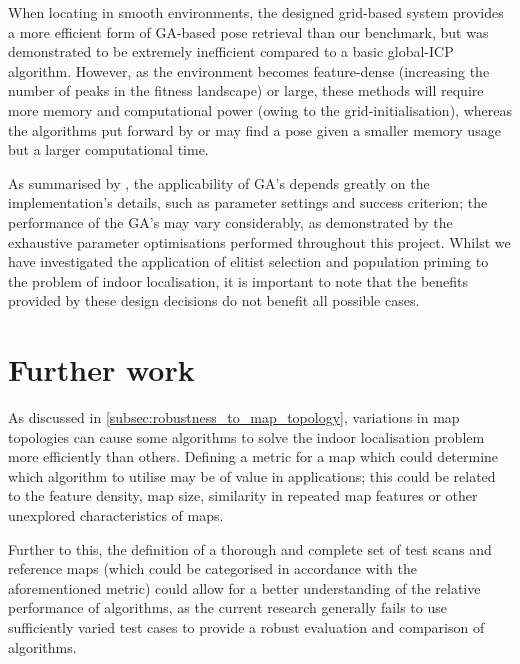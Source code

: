 \documentclass[authoryearcitations]{UoYCSproject}
\begin{document}
When locating in smooth environments, the designed grid-based system provides a more efficient form of GA-based pose retrieval than our benchmark, but was demonstrated to be extremely inefficient compared to a basic global-ICP algorithm. However, as the environment becomes feature-dense (increasing the number of peaks in the fitness landscape) or large, these methods will require more memory and computational power (owing to the grid-initialisation), whereas the algorithms put forward by \citet{Robertson2002-ou} or \citet{Lenac2007-xm} may find a pose given a smaller memory usage but a larger computational time. 

As summarised by \citet{Mitchell1998-td}, the applicability of GA's depends greatly on the implementation's details, such as parameter settings and success criterion; the performance of the GA's may vary considerably, as demonstrated by the exhaustive parameter optimisations performed throughout this project. Whilst we have investigated the application of elitist selection and population priming to the problem of indoor localisation, it is important to note that the benefits provided by these design decisions do not benefit all possible cases.

\section{Further work}
As discussed in \autoref{subsec:robustness_to_map_topology}, variations in map topologies can cause some algorithms to solve the indoor localisation problem more efficiently than others. Defining a metric for a map which could determine which algorithm to utilise may be of value in applications; this could be related to the feature density, map size, similarity in repeated map features or other unexplored characteristics of maps. 

Further to this, the definition of a thorough and complete set of test scans and reference maps (which could be categorised in accordance with the aforementioned metric) could allow for a better understanding of the relative performance of algorithms, as the current research generally fails to use sufficiently varied test cases to provide a robust evaluation and comparison of algorithms.

\clearpage


\end{document}
